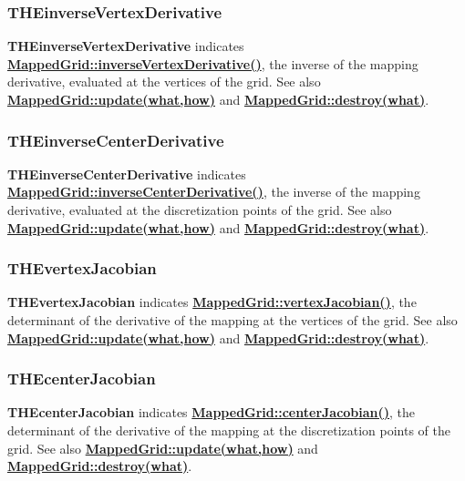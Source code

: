 \documentclass{article}
\begin{document}
  \subsubsection{THEinverseVertexDerivative}
  \label{MappedGrid::THEinverseVertexDerivative}
    \textbf{THEinverseVertexDerivative} indicates
    {\bf{}\hyperref{inverseVertexDerivative()}{inverseVertexDerivative() \rm(\S}{)}{MappedGrid::inverseVertexDerivative()}},
    the inverse of the mapping derivative, evaluated at the vertices of the grid.
    See also {\bf{}\hyperref{update(what,how)}{update(what,how) \rm(\S}{)}{MappedGrid::update(what,how)}}
    and {\bf{}\hyperref{destroy(what)}{destroy(what) \rm(\S}{)}{MappedGrid::destroy(what)}}.

  \subsubsection{THEinverseCenterDerivative}
  \label{MappedGrid::THEinverseCenterDerivative}
    \textbf{THEinverseCenterDerivative} indicates
    {\bf{}\hyperref{inverseCenterDerivative()}{inverseCenterDerivative() \rm(\S}{)}{MappedGrid::inverseCenterDerivative()}},
    the inverse of the mapping derivative, evaluated at the discretization points of the grid.
    See also {\bf{}\hyperref{update(what,how)}{update(what,how) \rm(\S}{)}{MappedGrid::update(what,how)}}
    and {\bf{}\hyperref{destroy(what)}{destroy(what) \rm(\S}{)}{MappedGrid::destroy(what)}}.

  \subsubsection{THEvertexJacobian}
  \label{MappedGrid::THEvertexJacobian}
    \textbf{THEvertexJacobian} indicates {\bf{}\hyperref{vertexJacobian()}{vertexJacobian() \rm(\S}{)}{MappedGrid::vertexJacobian()}},
    the determinant of the derivative of the mapping at the vertices of the grid.
    See also {\bf{}\hyperref{update(what,how)}{update(what,how) \rm(\S}{)}{MappedGrid::update(what,how)}}
    and {\bf{}\hyperref{destroy(what)}{destroy(what) \rm(\S}{)}{MappedGrid::destroy(what)}}.

  \subsubsection{THEcenterJacobian}
  \label{MappedGrid::THEcenterJacobian}
    \textbf{THEcenterJacobian} indicates {\bf{}\hyperref{centerJacobian()}{centerJacobian() \rm(\S}{)}{MappedGrid::centerJacobian()}},
    the determinant of the derivative of the mapping at the discretization points of the grid.
    See also {\bf{}\hyperref{update(what,how)}{update(what,how) \rm(\S}{)}{MappedGrid::update(what,how)}}
    and {\bf{}\hyperref{destroy(what)}{destroy(what) \rm(\S}{)}{MappedGrid::destroy(what)}}.
\end{document}

